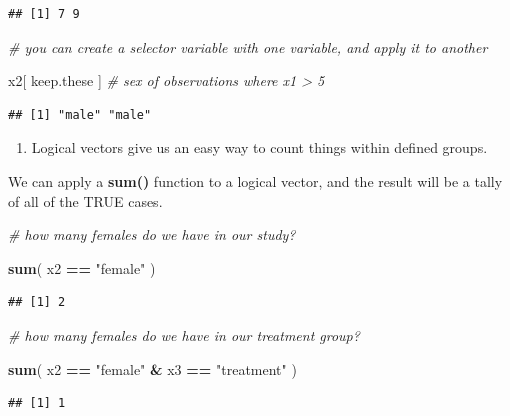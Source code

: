 \documentclass[]{book}
\newenvironment{Shaded}{\begin{snugshade}}{\end{snugshade}}
\newcommand{\CommentTok}[1]{\textcolor[rgb]{0.56,0.35,0.01}{\textit{#1}}}
\newcommand{\KeywordTok}[1]{\textcolor[rgb]{0.13,0.29,0.53}{\textbf{#1}}}
\newcommand{\NormalTok}[1]{#1}
\newcommand{\OperatorTok}[1]{\textcolor[rgb]{0.81,0.36,0.00}{\textbf{#1}}}
\newcommand{\StringTok}[1]{\textcolor[rgb]{0.31,0.60,0.02}{#1}}
\providecommand{\tightlist}{%
  \setlength{\itemsep}{0pt}\setlength{\parskip}{0pt}}
\theoremstyle{definition}
\theoremstyle{definition}
\theoremstyle{definition}
\theoremstyle{remark}
\begin{document}
\begin{verbatim}
## [1] 7 9
\end{verbatim}

\begin{Shaded}
\begin{Highlighting}[]
\CommentTok{# you can create a selector variable with one variable, and apply it to another}

\NormalTok{x2[ keep.these ]  }\CommentTok{# sex of observations where x1 > 5}
\end{Highlighting}
\end{Shaded}

\begin{verbatim}
## [1] "male" "male"
\end{verbatim}

\begin{enumerate}
\def\labelenumi{(\arabic{enumi})}
\setcounter{enumi}{1}
\tightlist
\item
  Logical vectors give us an easy way to count things within defined
  groups.
\end{enumerate}

We can apply a \textbf{sum()} function to a logical vector, and the
result will be a tally of all of the TRUE cases.

\begin{Shaded}
\begin{Highlighting}[]
\CommentTok{# how many females do we have in our study?}

\KeywordTok{sum}\NormalTok{( x2 }\OperatorTok{==}\StringTok{ "female"}\NormalTok{ )}
\end{Highlighting}
\end{Shaded}

\begin{verbatim}
## [1] 2
\end{verbatim}

\begin{Shaded}
\begin{Highlighting}[]
\CommentTok{# how many females do we have in our treatment group?}

\KeywordTok{sum}\NormalTok{( x2 }\OperatorTok{==}\StringTok{ "female"} \OperatorTok{&}\StringTok{ }\NormalTok{x3 }\OperatorTok{==}\StringTok{ "treatment"}\NormalTok{ )}
\end{Highlighting}
\end{Shaded}

\begin{verbatim}
## [1] 1
\end{verbatim}
\end{document}
